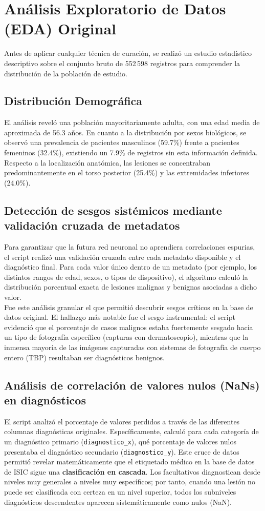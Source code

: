 \section{Análisis Exploratorio de Datos (EDA) Original}


Antes de aplicar cualquier técnica de curación, se realizó un estudio estadístico descriptivo sobre el conjunto bruto de 552\,598 registros para comprender la distribución de la población de estudio.

\subsection{Distribución Demográfica}
El análisis reveló una población mayoritariamente adulta, con una edad media de aproximada de 56.3 años. En cuanto a la distribución por sexos biológicos, se observó una prevalencia de pacientes masculinos (59.7\%) frente a pacientes femeninos (32.4\%), existiendo un 7.9\% de registros sin esta información definida. Respecto a la localización anatómica, las lesiones se concentraban predominantemente en el torso posterior (25.4\%) y las extremidades inferiores (24.0\%).

\subsection{Detección de sesgos sistémicos mediante validación cruzada de metadatos}
Para garantizar que la futura red neuronal no aprendiera correlaciones espurias, el script realizó una validación cruzada entre cada metadato disponible y el diagnóstico final. Para cada valor único dentro de un metadato (por ejemplo, los distintos rangos de edad, sexos, o tipos de dispositivo), el algoritmo calculó la distribución porcentual exacta de lesiones malignas y benignas asociadas a dicho valor. \\
Fue este análisis granular el que permitió descubrir sesgos críticos en la base de datos original. El hallazgo más notable fue el sesgo instrumental: el script evidenció que el porcentaje de casos malignos estaba fuertemente sesgado hacia un tipo de fotografía específico (capturas con dermatoscopio), mientras que la inmensa mayoría de las imágenes capturadas con sistemas de fotografía de cuerpo entero (TBP) resultaban ser diagnósticos benignos.

\subsection{Análisis de correlación de valores nulos (NaNs) en diagnósticos}
El script analizó el porcentaje de valores perdidos a través de las diferentes columnas diagnósticas originales. Específicamente, calculó para cada categoría de un diagnóstico primario (\texttt{diagnostico\_x}), qué porcentaje de valores nulos presentaba el diagnóstico secundario (\texttt{diagnostico\_y}). Este cruce de datos permitió revelar matemáticamente que el etiquetado médico en la base de datos de ISIC sigue una \textbf{clasificación en cascada}. Los facultativos diagnostican desde niveles muy generales a niveles muy específicos; por tanto, cuando una lesión no puede ser clasificada con certeza en un nivel superior, todos los subniveles diagnósticos descendentes aparecen sistemáticamente como nulos (NaN).

